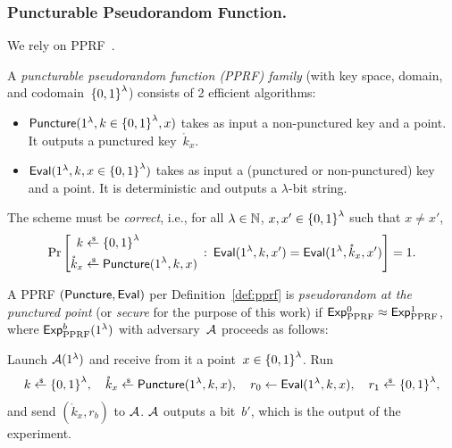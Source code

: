 \subsubsection{Puncturable Pseudorandom Function.}
We rely on PPRF~\cite{AC:BonWat13,CCS:KPTZ13,PKC:BoyGolIva14,STOC:SahWat14}.

\begin{definition}\label{def:pprf}
A \emph{puncturable pseudorandom function (PPRF) family} (with key space, domain, and codomain~${\{0,1\}}^\lambda$) consists of 2 efficient algorithms:
\begin{itemize}
\item ${\smash{\mathsf{Puncture}}}(1^\lambda,k\in{\{0,1\}}^\lambda,x)$
takes as input a non-punctured key and a point.
It outputs a punctured key~$\mathring{k}_x$.
\item ${\smash{\mathsf{Eval}}}(1^\lambda,k,x\in{\{0,1\}}^\lambda)$
takes as input a (punctured or non-punctured) key and a point.
It is deterministic and outputs a $\lambda$-bit string.
\end{itemize}
The scheme must be \emph{correct}, i.e., for all
${\lambda\in{\mathbb{N}}}$,
${x,x'\in{\{0,1\}}^\lambda}$ such that ${x\neq x'}$,
\begin{align*}
\Pr\left[
\begin{aligned}
k&{}\draws\bit^\lambda\\
\mathring{k}_x&{}\draws\Puncture(1^\lambda,k,x)
\end{aligned}
\::\:
\Eval(1^\lambda,k,x')
=
\Eval(1^\lambda,\mathring{k}_x,x')
\right]=1.
\end{align*}
\end{definition}

\begin{definition}\label{def:pprf-security}
A PPRF $({\smash{\mathsf{Puncture}}},{\smash{\mathsf{Eval}}})$ per Definition~\ref{def:pprf} is \emph{pseudorandom at the punctured point} (or \emph{secure} for the purpose of this work)
if ${{\smash{\mathsf{Exp}}_{\textup{PPRF}}^{0}}\approx{\smash{\mathsf{Exp}}_{\textup{PPRF}}^{1}}}$,
where ${\smash{\mathsf{Exp}}_{\textup{PPRF}}^{b}}(1^\lambda)$ with adversary~${\mathcal{A}}$ proceeds as follows:
\begin{security}
Launch ${\mathcal{A}}(1^\lambda)$ and receive from it a point~${x\in{\{0,1\}}^\lambda}$.
Run
\begin{align*}
\WideNarrow{}{\hspace*{-1.2em}}
k\draws\bit^\lambda,\quad
\mathring{k}_x\draws\Puncture(1^\lambda,k,x),\quad
r_0\gets\Eval(1^\lambda,k,x),\quad
r_1\draws\bit^\lambda,
\end{align*}
and send $(\mathring{k}_x,r_b)$ to ${\mathcal{A}}$.
${\mathcal{A}}$ outputs a bit~$b'$, which is the output of the experiment.
\end{security}
\end{definition}

